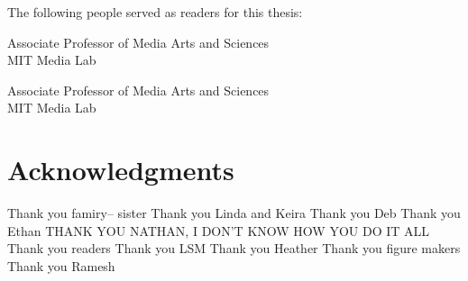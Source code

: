 %
%
%

\begin{titlepage}
\begin{large}
The following people served as readers for this thesis:

\signature{Sepandar Kamvar}{Associate Professor of Media Arts and Sciences \\
   MIT Media Lab}

\signature{Iyad Rahwan}{Associate Professor of Media Arts and Sciences \\
   MIT Media Lab}
 
\end{large}
\end{titlepage}
 
\cleardoublepage

\section*{Acknowledgments}

Thank you famiry-- sister
Thank you Linda and Keira
Thank you Deb
Thank you Ethan
THANK YOU NATHAN, I DON'T KNOW HOW YOU DO IT ALL
Thank you readers
Thank you LSM
Thank you Heather
Thank you figure makers 
Thank you Ramesh


